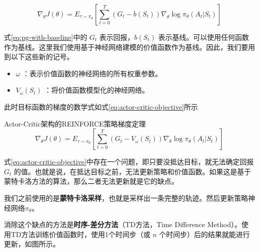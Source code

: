 \documentclass[lang=cn,newtx,10pt,scheme=chinese]{elegantbook}
\begin{document}
\begin{equation}\label{eq:pg-with-baseline}
\nabla_{\theta}J(\theta)=E_{\tau\sim\pi_{\theta}}[\sum_{t=0}^T(G_t-b(S_t))\nabla_{\theta}\log\pi_{\theta}(A_t|S_t)]
\end{equation}

式\ref{eq:pg-with-baseline}中的 $G_t$ 表示回报，$b(S_t)$ 表示基线。可以使用任何函数作为基线。这里我们使用基于神经网络建模的价值函数作为基线。因此，我们要用到以下这些新的记号。

\begin{itemize}
\item $\omega$ ：表示价值函数的神经网络的所有权重参数。
\item $V_{\omega}(S_t)$ ：将价值函数模型化的神经网络。
\end{itemize}

此时目标函数的梯度的数学式如式\ref{eq:actor-critic-objective}所示

\begin{theorem}{Actor-Critic架构的REINFORCE策略梯度定理}{}
\begin{equation}\label{eq:actor-critic-objective}
\nabla_{\theta}J(\theta)=E_{\tau\sim\pi_{\theta}}\left[\sum_{t=0}^T(G_t-V_{\omega}(S_t))\nabla_{\theta}\log\pi_{\theta}(A_t|S_t)\right]
\end{equation}
\end{theorem}

式\ref{eq:actor-critic-objective}中存在一个问题，即只要没抵达目标，就无法确定回报 $G_t$ 的值。也就是说，在抵达目标之前，无法更新策略和价值函数。如果这是基于蒙特卡洛方法的算法，那么二者无法更新就是它的缺点。

\begin{marker}
我们之前使用的是\textbf{蒙特卡洛采样}，也就是采样出一条完整的轨迹。然后更新策略神经网络$\pi_\theta$。
\end{marker}

消除这个缺点的方法是\textbf{时序-差分方法}（TD方法，Time Difference Method）。使用TD方法训练价值函数时，使用1个时间步（或 $n$ 个时间步）后的结果就能进行更新，如图所示。
\end{document}
